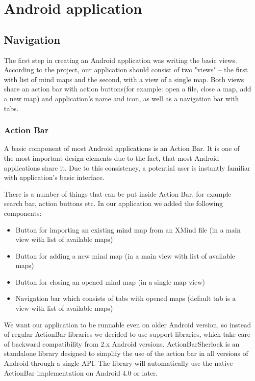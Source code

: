 \section{Android application}
\label{sec:android-app}

\subsection{Navigation}
\label{subsec:drawing}
The first step in creating an Android application was writing the basic views. According to the project, our application should consist of two "views" -- the first with list of mind maps and the second, with a view of a single map. Both views share an action bar with action buttons(for example: open a file, close a map, add a new map) and application's name and icon, as well as a navigation bar with tabs. 

\subsubsection{Action Bar}
\label{subsubsec:action-bar}
A basic component of most Android applications is an Action Bar. It is one of the most important design elements due to the fact, that most Android applications share it. Due to this consistency, a potential user is instantly familiar with application's basic interface. 

There is a number of things that can be put inside Action Bar, for example search bar, action buttons etc. In our application we added the following components:
\begin{itemize}
	\item Button for importing an existing mind map  from an XMind file (in a main view with list of available maps)
	\item Button for adding a new mind map (in a main view with list of available maps)
	\item Button for closing an opened mind map (in a single map view)
	\item Navigation bar which consists of tabs with opened maps (default tab is a view with list of available maps)
\end{itemize}

We want our application to be runnable even on older Android version, so instead of regular ActionBar libraries we decided to use support libraries, which take care of backward compatibility from 2.x Android versions.
ActionBarSherlock is an standalone library designed to simplify the use of the action bar in all versions of Android through a single API. The library will automatically use the native ActionBar implementation on Android 4.0 or later\cite{Wharton:2013:sherlock}.


